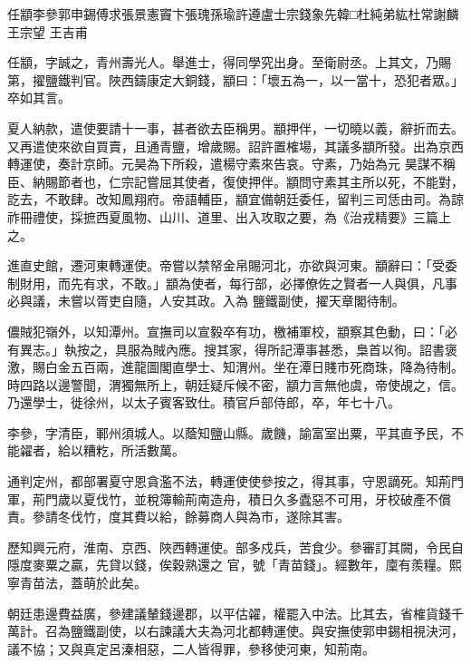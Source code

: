 
\begin{pinyinscope}

 任顓李參郭申錫傅求張景憲竇卞張瑰孫瑜許遵盧士宗錢象先韓□杜純弟紘杜常謝麟王宗望
 王吉甫



 任顓，字誠之，青州壽光人。舉進士，得同學究出身。至衛尉丞。上其文，乃賜第，擢鹽鐵判官。陜西鑄康定大銅錢，顓曰：「壞五為一，以一當十，恐犯者眾。」卒如其言。



 夏人納款，遣使要請十一事，甚者欲去臣稱男。顓押伴，一切曉以義，辭折而去。又再遣使來欲自買賣，且通青鹽，增歲賜。詔許置榷場，其議多顓所發。出為京西轉運使，奏計京師。元昊為下所殺，遣楊守素來告哀。守素，乃始為元
 昊謀不稱臣、納賜節者也，仁宗記嘗屈其使者，復使押伴。顓問守素其主所以死，不能對，訖去，不敢肆。改知鳳翔府。帝語輔臣，顓宜備朝廷委任，留判三司恁由司。為諒祚冊禮使，採摭西夏風物、山川、道里、出入攻取之要，為《治戎精要》三篇上之。



 進直史館，遷河東轉運使。帝嘗以禁帑金帛賜河北，亦欲與河東。顓辭曰：「受委制財用，而先有求，不敢。」顓為使者，每行部，必擇僚佐之賢者一人與俱，凡事必與議，未嘗以胥吏自隨，人安其政。入為
 鹽鐵副使，擢天章閣待制。



 儂賊犯嶺外，以知潭州。宣撫司以宣毅卒有功，檄補軍校，顓察其色動，曰：「必有異志。」執按之，具服為賊內應。搜其家，得所記潭事甚悉，梟首以徇。詔書褒激，賜白金五百兩，進龍圖閣直學士、知渭州。坐在潭日賤市死商珠，降為待制。時四路以邊警聞，渭獨無所上，朝廷疑斥候不密，顓力言無他虞，帝使覘之，信。乃還學士，徙徐州，以太子賓客致仕。積官戶部侍郎，卒，年七十八。



 李參，字清臣，鄆州須城人。以蔭知鹽山縣。歲饑，諭富室出粟，平其直予民，不能糴者，給以糟籺，所活數萬。



 通判定州，都部署夏守恩貪濫不法，轉運使使參按之，得其事，守恩謫死。知荊門軍，荊門歲以夏伐竹，並稅簿輸荊南造舟，積日久多蠹惡不可用，牙校破產不償責。參請冬伐竹，度其費以給，餘募商人與為市，遂除其害。



 歷知興元府，淮南、京西、陜西轉運使。部多戍兵，苦食少。參審訂其闕，令民自隱度麥粟之贏，先貸以錢，俟穀熟還之
 官，號「青苗錢」。經數年，廩有羨糧。熙寧青苗法，蓋萌於此矣。



 朝廷患邊費益廣，參建議輦錢邊郡，以平估糴，權罷入中法。比其去，省榷貨錢千萬計。召為鹽鐵副使，以右諫議大夫為河北都轉運使。與安撫使郭申錫相視決河，議不協；又與真定呂溱相惡，二人皆得罪，參移使河東，知荊南。




\end{pinyinscope}
